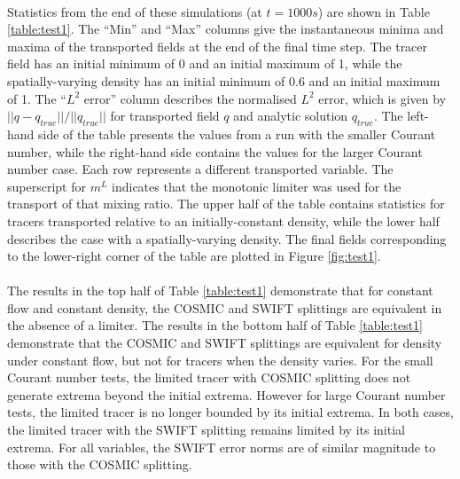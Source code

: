 \documentclass{ametsocV6.1}
\begin{document}
\\
Statistics from the end of these simulations (at $t=1000 s$) are shown in Table \ref{table:test1}.
The ``Min'' and ``Max'' columns give the instantaneous minima and maxima of the transported fields at the end of the final time step.
The tracer field has an initial minimum of 0 and an initial maximum of 1, while the spatially-varying density has an initial minimum of 0.6 and an initial maximum of 1.
The ``$L^2$ error'' column describes the normalised $L^2$ error, which is given by $||q - q_{true}||/||q_{true}||$ for transported field $q$ and analytic solution $q_{true}$.
The left-hand side of the table presents the values from a run with the smaller Courant number, while the right-hand side contains the values for the larger Courant number case.
Each row represents a different transported variable.
The superscript for $m^L$ indicates that the monotonic limiter was used for the transport of that mixing ratio.
The upper half of the table contains statistics for tracers transported relative to an initially-constant density, while the lower half describes the case with a spatially-varying density.
The final fields corresponding to the lower-right corner of the table are plotted in Figure \ref{fig:test1}.\\
\\
The results in the top half of Table \ref{table:test1} demonstrate that for constant flow and constant density, the COSMIC and SWIFT splittings are equivalent in the absence of a limiter. The results in the bottom half of Table \ref{table:test1} demonstrate that the COSMIC and SWIFT splittings are equivalent for density under constant flow, but not for tracers when the density varies. 
For the small Courant number tests, the limited tracer with COSMIC splitting does not generate extrema beyond the initial extrema.
However for large Courant number tests, the limited tracer is no longer bounded by its initial extrema.
In both cases, the limited tracer with the SWIFT splitting remains limited by its initial extrema.
For all variables, the SWIFT error norms are of similar magnitude to those with the COSMIC splitting.
\end{document}
